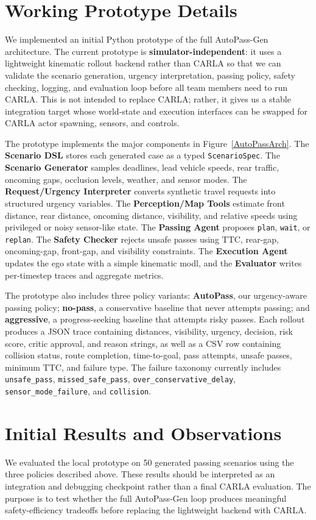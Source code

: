 \documentclass[10pt,twocolumn,letterpaper]{article}
\begin{document}
\section{Working Prototype Details}
We implemented an initial Python prototype of the full AutoPass-Gen architecture. The current prototype is \textbf{simulator-independent}: it uses a lightweight kinematic rollout backend rather than CARLA so that we can validate the scenario generation, urgency interpretation, passing policy, safety checking, logging, and evaluation loop before all team members need to run CARLA. This is not intended to replace CARLA; rather, it gives us a stable integration target whose world-state and execution interfaces can be swapped for CARLA actor spawning, sensors, and controls.

The prototype implements the major components in Figure~\ref{AutoPassArch}. The \textbf{Scenario DSL} stores each generated case as a typed \texttt{ScenarioSpec}. The \textbf{Scenario Generator} samples deadlines, lead vehicle speeds, rear traffic, oncoming gaps, occlusion levels, weather, and sensor modes. The \textbf{Request/Urgency Interpreter} converts synthetic travel requests into structured urgency variables. The \textbf{Perception/Map Tools} estimate front distance, rear distance, oncoming distance, visibility, and relative speeds using privileged or noisy sensor-like state. The \textbf{Passing Agent} proposes \texttt{plan}, \texttt{wait}, or \texttt{replan}. The \textbf{Safety Checker} rejects unsafe passes using TTC, rear-gap, oncoming-gap, front-gap, and visibility constraints. The \textbf{Execution Agent} updates the ego state with a simple kinematic modl, and the \textbf{Evaluator} writes per-timestep traces and aggregate metrics.

The prototype also includes three policy variants: \textbf{AutoPass}, our urgency-aware passing policy; \textbf{no-pass}, a conservative baseline that never attempts passing; and \textbf{aggressive}, a progress-seeking baseline that attempts risky passes. Each rollout produces a JSON trace containing distances, visibility, urgency, decision, risk score, critic approval, and reason strings, as well as a CSV row containing collision status, route completion, time-to-goal, pass attempts, unsafe passes, minimum TTC, and failure type. The failure taxonomy currently includes \texttt{unsafe\_pass}, \texttt{missed\_safe\_pass}, \texttt{over\_conservative\_delay}, \texttt{sensor\_mode\_failure}, and \texttt{collision}.

\section{Initial Results and Observations}
We evaluated the local prototype on 50 generated passing scenarios using the three policies described above. These results should be interpreted as an integration and debugging checkpoint rather than a final CARLA evaluation. The purpose is to test whether the full AutoPass-Gen loop produces meaningful safety-efficiency tradeoffs before replacing the lightweight backend with CARLA.
\end{document}

